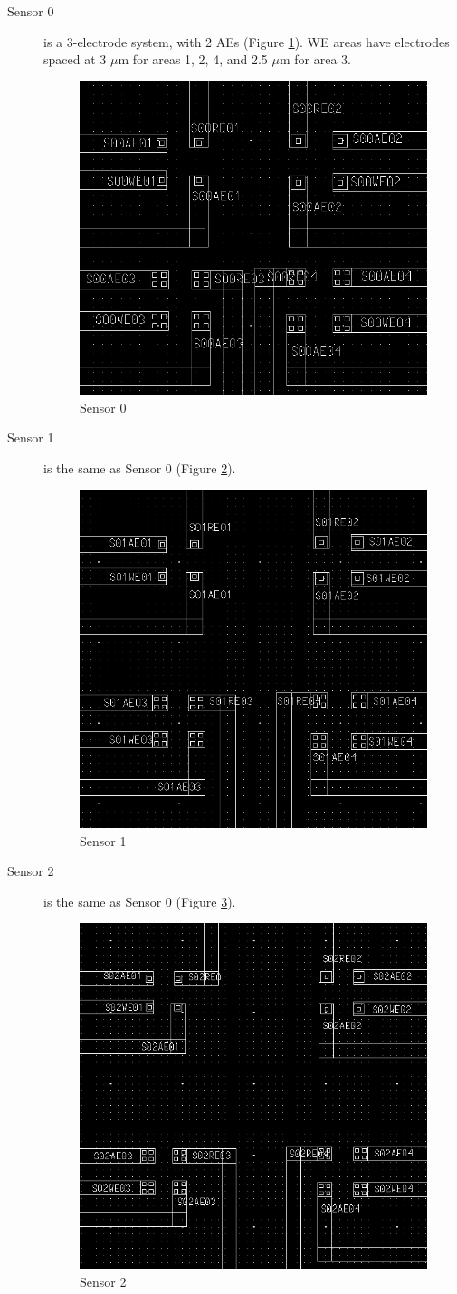 \begin{description}
\item[Sensor 0] is a 3-electrode system, with 2 AEs (Figure \ref{s00}). WE areas have electrodes spaced at 3 $\mu \mathrm{m}$ for areas 1, 2, 4, and 2.5 $\mu \mathrm{m}$ for area 3.
\begin{figure}
	\centering
	\includegraphics[width=0.3\linewidth]{figures/s00.png}
	\caption{Sensor 0}
	\label{s00}
\end{figure}

\item[Sensor 1] is the same as Sensor 0 (Figure \ref{s01}).
\begin{figure}
	\centering
	\includegraphics[width=0.3\linewidth]{figures/s01.png}
	\caption{Sensor 1}
	\label{s01}
\end{figure}

\item[Sensor 2] is the same as Sensor 0 (Figure \ref{s02}).
\begin{figure}
	\centering
	\includegraphics[width=0.3\linewidth]{figures/s02.png}
	\caption{Sensor 2}
	\label{s02}
\end{figure}


\end{description}
